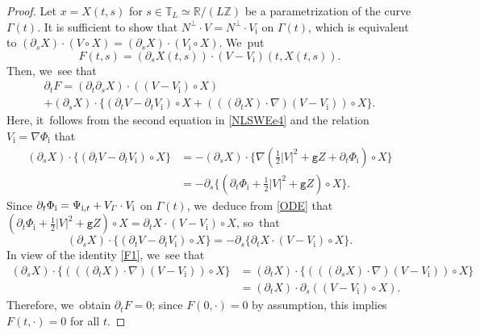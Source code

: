 \documentclass[10pt]{amsart}
\newcommand{\gr}{{\mathtt g}}
\newcommand{\R}{{\mathbb R}}
\newcommand{\dt}{\partial_t}
\newcommand{\itGamma}{\mathit{\Gamma}}
\theoremstyle{definition}
\begin{document}
\begin{proof}
Let $x=X(t,s)$ for $s\in\mathbb{T}_L\simeq\R/(L\mathbb{Z})$ be a parametrization of the curve $\itGamma(t)$.
It is sufficient to show that $N^\perp\cdot V=N^\perp\cdot V_\mathrm{i}$ on $\itGamma(t)$, which is equivalent to
$(\partial_s X)\cdot(V\circ X)=(\partial_s X)\cdot(V_\mathrm{i}\circ X)$. We~put
\[
F(t,s)=(\partial_s X(t,s))\cdot(V-V_\mathrm{i})(t,X(t,s)).
\]
Then, we~see that
\begin{multline*}
\dt F= (\dt\partial_s X)\cdot ((V-V_\mathrm{i})\circ X) \\
+ (\partial_s X)\cdot\{ (\dt V-\dt V_\mathrm{i})\circ X + (((\dt X)\cdot\nabla)(V-V_\mathrm{i}))\circ X \}.
\end{multline*}
Here, it~follows from the second equation in \eqref{NLSWEe4} and the relation $V_\mathrm{i}=\nabla\Phi_\mathrm{i}$ that
\begin{align*}
(\partial_s X)\cdot \{ (\dt V-\dt V_\mathrm{i})\circ X \}
&= - (\partial_s X)\cdot \{ \nabla(\tfrac12|V|^2+\gr Z+\dt\Phi_\mathrm{i})\circ X \} \\
&= - \partial_s \{ (\dt\Phi_\mathrm{i}+\tfrac12|V|^2+\gr Z)\circ X \}.
\end{align*}
Since $\dt \Phi_\mathrm{i}=\Psi_{{\rm i},t}+V_{\itGamma}\cdot V_\mathrm{i}$ on $\itGamma(t)$, we~deduce from \eqref{ODE} that $(\dt\Phi_\mathrm{i}+\tfrac12|V|^2+\gr Z)\circ X=\partial_t X\cdot(V-V_\mathrm{i})\circ X$, so~that
\[
(\partial_s X)\cdot \{ (\dt V-\dt V_\mathrm{i})\circ X \}= - \partial_s \{ \partial_t X\cdot(V-V_\mathrm{i})\circ X\}.
\]
In view of the identity \eqref{F1}, we~see that
\begin{align*}
(\partial_s X)\cdot\{ (((\dt X)\cdot\nabla)(V-V_\mathrm{i}))\circ X \}
&= (\dt X)\cdot\{ (((\partial_s X)\cdot\nabla)(V-V_\mathrm{i}))\circ X \} \\
&= (\dt X)\cdot \partial_s((V-V_\mathrm{i})\circ X).
\end{align*}
Therefore, we~obtain $\dt F=0$; since $F(0,\cdot)=0$ by assumption, this implies $F(t,\cdot)=0$ for all $t$.
\end{proof}
\end{document}
